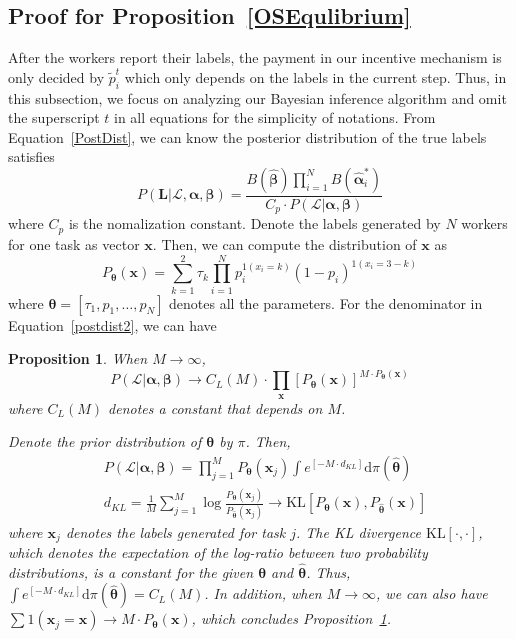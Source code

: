 \documentclass{article}
\makeatletter
\newtheorem{proposition}[theorem]{Proposition}
\renewenvironment{proof}[1][\proofname]{\par
  \vspace{-\topsep}%
  \pushQED{\qed}%
  \normalfont
  \topsep0pt \partopsep0pt %
  \trivlist
  \item[\hskip\labelsep
        \itshape
    #1\@addpunct{.}]\ignorespaces
}{%
  \popQED\endtrivlist\@endpefalse
  \addvspace{0pt plus 0pt} %
}
\makeatother
\begin{document}
\subsection{Proof for Proposition~\ref{OSEqulibrium}}
After the workers report their labels, the payment in our incentive mechanism is only decided by $\tilde{p}^t_i$ which only depends on the labels in the current step.
Thus, in this subsection, we focus on analyzing our Bayesian inference algorithm and omit the superscript $t$ in all equations for the simplicity of notations.
From Equation~\ref{PostDist}, we can know the posterior distribution of the true labels satisfies
\begin{equation}
\label{postdist2}
P(\bm{L}|\mathcal{L}, \bm{\alpha}, \bm{\beta})=\frac{B(\hat{\bm{\beta}})\prod_{i=1}^{N}B(\hat{\bm{\alpha}}^{*}_{i})}{C_p\cdot P(\mathcal{L}|\bm{\alpha}, \bm{\beta})}
\end{equation}
where $C_p$ is the nomalization constant.
Denote the labels generated by $N$ workers for one task as vector $\bm{x}$.
Then, we can compute the distribution of $\bm{x}$ as
\begin{equation}
P_{\bm{\theta}}(\bm{x}) = {\sum}_{k=1}^{2}\tau_k{\prod}_{i=1}^{N}p_i^{1(x_i=k)}(1-p_i)^{1(x_i=3-k)}
\end{equation}
where $\bm{\theta}=[\tau_1, p_1,\ldots,p_N]$ denotes all the parameters.
For the denominator in Equation~\ref{postdist2}, we can have
\begin{proposition}
\label{Denominator}
When $M\rightarrow \infty$, 
\begin{equation}
P(\mathcal{L}|\bm{\alpha}, \bm{\beta})\rightarrow C_{L}(M) \cdot {\prod}_{\bm{x}} [P_{\bm{\theta}}(\bm{x})]^{M\cdot P_{\bm{\theta}}(\bm{x})}
\end{equation}
where $C_{L}(M)$ denotes a constant that depends on $M$.
\begin{proof}
Denote the prior distribution of $\bm{\theta}$ by $\pi$. Then,
\begin{align}
&P(\mathcal{L}|\bm{\alpha}, \bm{\beta})= {\prod}_{j=1}^{M}P_{\bm{\theta}}(\bm{x}_j) \int e^{[-M\cdot d_{KL}]} \mathrm{d}\pi(\hat{\bm{\theta}})\\
&d_{KL}=\frac{1}{M}\sum_{j=1}^{M}\log \frac{P_{\bm{\theta}}(\bm{x}_j)}{P_{\bm{\hat{\theta}}}(\bm{x}_j)}\rightarrow \mathrm{KL}[P_{\bm{\theta}}(\bm{x}),P_{\bm{\hat{\theta}}}(\bm{x})]
\end{align}
where $\bm{x}_j$ denotes the labels generated for task $j$. The KL divergence $\mathrm{KL}[\cdot, \cdot]$, which denotes the expectation of the log-ratio between two probability distributions, is a constant for the given $\bm{\theta}$ and $\hat{\bm{\theta}}$.
Thus, $\int e^{[-M\cdot d_{KL}]} \mathrm{d}\pi(\hat{\bm{\theta}})=C_{L}(M)$.
In addition, when $M\rightarrow \infty$, we can also have $\sum 1(\bm{x}_j=\bm{x})\rightarrow M \cdot P_{\bm{\theta}}(\bm{x})$, which concludes Proposition~\ref{Denominator}.
\end{proof}
\end{proposition}
\end{document}

